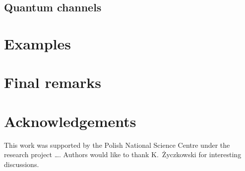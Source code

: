 \documentclass[11pt,a4paper]{article}
\newcommand{\1}{{\bf 1}}
\begin{document}
\subsection{Quantum channels}

\section{Examples}

\section{Final remarks}

\section{Acknowledgements}
This work was supported by the Polish National Science Centre under the research
project \dots. Authors would like to thank K.~\.Zyczkowski for interesting
discussions.



\end{document}
